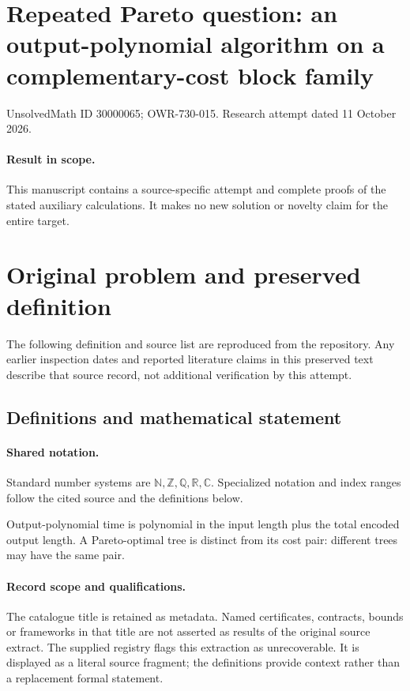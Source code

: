 \documentclass[11pt]{article}
\begin{document}
\section*{Repeated Pareto question: an output-polynomial algorithm on a complementary-cost block family}
\noindent UnsolvedMath ID 30000065; OWR-730-015. Research attempt dated 11 October 2026.
\paragraph{Result in scope.}This manuscript contains a source-specific attempt and complete proofs of the stated auxiliary calculations. It makes no new solution or novelty claim for the entire target.
\section{Original problem and preserved definition}
The following definition and source list are reproduced from the repository. Any earlier inspection dates and reported literature claims in this preserved text describe that source record, not additional verification by this attempt.
\subsection{Definitions and mathematical statement}

\paragraph{Shared notation.}Standard number systems are $\mathbb N,\mathbb Z,\mathbb Q,\mathbb R,\mathbb C$. Specialized notation and index ranges follow the cited source and the definitions below.


Output-polynomial time is polynomial in the input length plus the total encoded output length. A Pareto-optimal tree is distinct from its cost pair: different trees may have the same pair.
\paragraph{Record scope and qualifications.}
The catalogue title is retained as metadata. Named certificates, contracts, bounds or frameworks in that title are not asserted as results of the original source extract.
The supplied registry flags this extraction as unrecoverable. It is displayed as a literal source fragment; the definitions provide context rather than a replacement formal statement.
\end{document}
